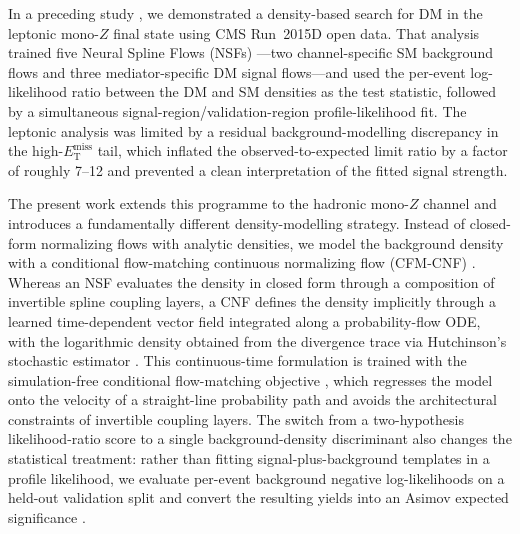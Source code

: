 \documentclass[11pt,a4paper,twocolumn]{article}
\newcommand{\MET}{\ensuremath{E_{\mathrm{T}}^{\mathrm{miss}}}}
\begin{document}
In a preceding study \cite{rasineni_nsf_monoz}, we demonstrated a
density-based search for DM in the leptonic mono-$Z$ final state using CMS
Run~2015D open data. That analysis trained five Neural Spline Flows
(NSFs) \cite{durkan_nsf,papamakarios_flows}---two channel-specific SM
background flows and three mediator-specific DM signal flows---and used the
per-event log-likelihood ratio between the DM and SM densities as the test
statistic, followed by a simultaneous signal-region/validation-region
profile-likelihood fit. The leptonic analysis was limited by a residual
background-modelling discrepancy in the high-\MET{} tail, which inflated the
observed-to-expected limit ratio by a factor of roughly 7--12 and prevented a
clean interpretation of the fitted signal strength.

The present work extends this programme to the hadronic mono-$Z$ channel and
introduces a fundamentally different density-modelling strategy. Instead of
closed-form normalizing flows with analytic densities, we model the
background density with a conditional flow-matching continuous normalizing
flow (CFM-CNF) \cite{lipman_flow_matching,chen_neural_ode}. Whereas an NSF
evaluates the density in closed form through a composition of invertible
spline coupling layers, a CNF defines the density implicitly through a
learned time-dependent vector field integrated along a probability-flow ODE,
with the logarithmic density obtained from the divergence trace via
Hutchinson's stochastic estimator \cite{grathwohl_ffjord}. This
continuous-time formulation is trained with the simulation-free conditional
flow-matching objective \cite{lipman_flow_matching}, which regresses the
model onto the velocity of a straight-line probability path and avoids the
architectural constraints of invertible coupling layers. The switch from a
two-hypothesis likelihood-ratio score to a single background-density
discriminant also changes the statistical treatment: rather than fitting
signal-plus-background templates in a profile likelihood, we evaluate
per-event background negative log-likelihoods on a held-out validation split
and convert the resulting yields into an Asimov expected significance
\cite{cowan_asymptotic}.
\end{document}
